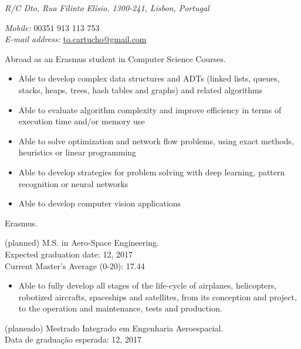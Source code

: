 \documentclass{article}
\begin{document}


\begin{llist}


\textit{ R/C Dto, Rua Filinto El\'{i}sio, 1300-241, Lisbon, Portugal}

\textit{Mobile:} 00351 913 113 753\\
\textit{E-mail address: }\href{mailto:to.cartucho@gmail.com}{to.cartucho@gmail.com}\\


 
{
Abroad as an Erasmus student in Computer Science Courses.
\begin{itemize}
\item[\textendash] Able to develop complex data structures and ADTs (linked lists, queues, stacks, heaps, trees, hash tables and graphs) and related algorithms
\item[\textendash] Able to evaluate algorithm complexity and improve efficiency in terms of execution time and/or memory use
\item[\textendash] Able to solve optimization and network flow problems, using exact methods, heuristics or linear programming
\item[\textendash] Able to develop strategies for problem solving with deep learning, pattern recognition or neural networks
\item[\textendash] Able to develop computer vision applications
\end{itemize}
}
{
Erasmus.
}

 
{
(planned) M.S. in Aero-Space Engineering.\\
Expected graduation date: 12, 2017\\
Current Master's Average (0-20): 17.44

\begin{itemize}
\item[\textendash] Able to fully develop all stages of the life-cycle of airplanes, helicopters, robotized aircrafts, spaceships and satellites, from its conception and project, to the operation and maintenance, tests and production.
\end{itemize}
}
{
(planeado) Mestrado Integrado em Engenharia Aeroespacial.\\
Data de gradua\c{c}\~{a}o esperada: 12, 2017
}


\end{llist}
\end{document}
